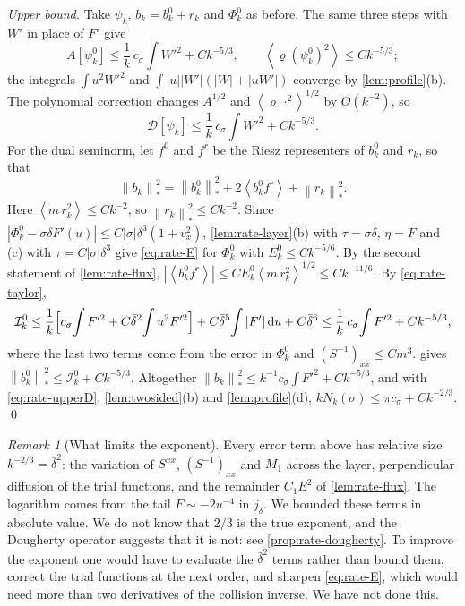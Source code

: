 \documentclass[11pt]{article}
\newcommand{\dd}{\,\mathrm d}
\newcommand{\av}[1]{\left\langle #1\right\rangle}
\newcommand{\D}{\mathcal D}
\newcommand{\nstar}[1]{\left\|#1\right\|_*}
\theoremstyle{definition}
\theoremstyle{remark}
\newtheorem{remark}[theorem]{Remark}
\numberwithin{equation}{section}
\begin{document}
\emph{Upper bound.} Take $\psi_k$, $b_k=b_k^0+r_k$ and $\Phi_k^0$ as before.
The same three steps with $W'$ in place of $F'$ give
\[
 A[\psi_k^0]\leq\frac1k\,c_\sigma\!\int W'^2+Ck^{-5/3},\qquad
 \av{\varrho(\psi_k^0)^2}\leq Ck^{-5/3};
\]
the integrals $\int u^2W'^2$ and $\int|u||W'|(|W|+|uW'|)$ converge by
\cref{lem:profile}(b). The polynomial correction changes $A^{1/2}$ and
$\av{\varrho\,\cdot^2}^{1/2}$ by $O(k^{-2})$, so
\begin{equation}
 \D[\psi_k]\leq\frac1k\,c_\sigma\!\int W'^2+Ck^{-5/3}.
 \label{eq:rate-upperD}
\end{equation}
For the dual seminorm, let $f^0$ and $f^r$ be the Riesz representers of
$b_k^0$ and $r_k$, so that
\[
 \nstar{b_k}^2=\nstar{b_k^0}^2+2\av{b_k^0f^r}+\nstar{r_k}^2 .
\]
Here $\av{m\,r_k^2}\leq Ck^{-2}$, so $\nstar{r_k}^2\leq Ck^{-2}$. Since
$|\Phi_k^0-\sigma\delta F'(u)|\leq C|\sigma|\delta^3(1+v_x^2)$,
\cref{lem:rate-layer}(b) with $\tau=\sigma\delta$, $\eta=F$ and (c) with
$\tau=C|\sigma|\delta^3$ give \eqref{eq:rate-E} for $\Phi_k^0$ with
$E_k^0\leq Ck^{-5/6}$. By the second statement of \cref{lem:rate-flux},
$|\av{b_k^0f^r}|\leq CE_k^0\av{m\,r_k^2}^{1/2}\leq Ck^{-11/6}$. By
\eqref{eq:rate-taylor},
\[
 \mathcal I_k^0\leq\frac1k\Bigl[c_\sigma\!\int F'^2
   +C\bar\delta^2\!\int u^2F'^2\Bigr]
   +C\bar\delta^5\!\int|F'|\dd u+C\bar\delta^6
 \leq\frac1k\,c_\sigma\!\int F'^2+Ck^{-5/3},
\]
where the last two terms come from the error in $\Phi_k^0$ and
$(S^{-1})_{xx}\leq Cm^3$.  gives
$\nstar{b_k^0}^2\leq\mathcal I_k^0+Ck^{-5/3}$. Altogether
$\nstar{b_k}^2\leq k^{-1}c_\sigma\!\int F'^2+Ck^{-5/3}$, and with
\eqref{eq:rate-upperD}, \cref{lem:twosided}(b) and \cref{lem:profile}(d),
$kN_k(\sigma)\leq\pi c_\sigma+Ck^{-2/3}$. \qed

\begin{remark}[What limits the exponent]\label{rem:rate-limits}
Every error term above has relative size $k^{-2/3}=\bar\delta^2$: the
variation of $S^{xx}$, $(S^{-1})_{xx}$ and $M_1$ across the layer,
perpendicular diffusion of the trial functions, and the remainder
$C_1E^2$ of \cref{lem:rate-flux}. The logarithm comes from the tail
$F\sim-2u^{-4}$ in $j_\delta$. We bounded these terms in absolute value. We
do not know that $2/3$ is the true exponent, and the Dougherty operator
suggests that it is not: see \cref{prop:rate-dougherty}. To improve the
exponent one would have to evaluate the $\bar\delta^2$ terms rather than
bound them, correct the trial functions at the next order, and sharpen
\eqref{eq:rate-E}, which would need more than two derivatives of the
collision inverse. We have not done this.
\end{remark}
\end{document}
